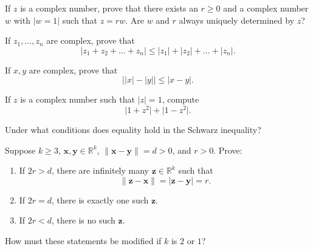 \documentclass[12 pt, letterpaper]{hmcpset}
\begin{document}
\pagebreak

\begin{problem}[11.]
	If $z$ is a complex number, prove that there exists an $r \ge 0$ and a complex number $w$ with $\lvert w = 1 \rvert$ such that $z = r w$. Are $w$ and $r$ always uniquely determined by $z$?
\end{problem}

\pagebreak

\begin{problem}[12.]
	If $z_{1}, \dots, z_{n}$ are complex, prove that
	\[
		\lvert z_{1} + z_{2} + \dots + z_{n} \rvert \le \lvert z_{1} \rvert + \lvert z_{2} \rvert + \dots + \lvert z_{n} \rvert.
	\]
\end{problem}

\pagebreak

\begin{problem}[13.]
	If $x, y$ are complex, prove that
	\[
		\lvert \lvert x \rvert - \lvert y \rvert \rvert \le \lvert x - y \rvert.
	\]
\end{problem}

\pagebreak

\begin{problem}[14.]
	If $z$ is a complex number such that $\lvert z  \rvert = 1$, compute
	\[
		\lvert 1 + z^{2} \rvert + \lvert 1 - z^{2} \rvert.
	\]
\end{problem}

\pagebreak

\begin{problem}[15.]
	Under what conditions does equality hold in the Schwarz inequality?
\end{problem}

\pagebreak

\begin{problem}[16.]
	Suppose $k \ge 3$, $\mathbf{x}, \mathbf{y} \in \mathbb{R}^{k}$, $\lVert \mathbf{x} - \mathbf{y} \rVert = d > 0$, and $r > 0$. Prove:
	\begin{enumerate}
		\item If $2r > d$, there are infinitely many $\mathbf{z} \in \mathbb{R}^{k}$ such that 
			\[
				\lVert \mathbf{z} - \mathbf{x} \rVert = \lvert \mathbf{z} - \mathbf{y} \rvert = r.
			\]
		\item If $2r = d$, there is exactly one such $\mathbf{z}$.
		\item If $2r < d$, there is no such $\mathbf{z}$.
	\end{enumerate}
	How must these statements be modified if $k$ is $2$ or $1$?
\end{problem}
\end{document}
